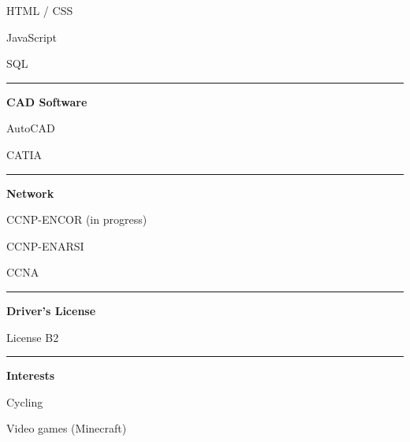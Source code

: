 \documentclass[a4paper]{letter}
\newcommand{\divider}{\rule{\linewidth}{0.9pt}}
\begin{document}
\begin{minipage}[t]{0.40\textwidth}
\faCircleNotch \quad HTML / CSS

\faCircleNotch \quad JavaScript

\faCircleNotch \quad SQL

\divider


{\large \textbf{CAD Software}}

\faCircleNotch \quad AutoCAD

\faCircleNotch \quad CATIA

\divider


{\large \textbf{Network}}

\faNetworkWired \quad CCNP-ENCOR (in progress)

\faNetworkWired \quad CCNP-ENARSI

\faNetworkWired \quad CCNA

\divider


{\large \textbf{Driver's License}}

\faCar \quad License B2

\divider


{\large \textbf{Interests}}

\faBicycle \quad Cycling

\faGamepad \quad Video games (Minecraft)

\end{minipage}
\hfill
\end{document}
